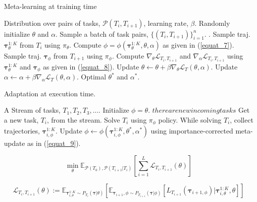 \documentclass[12pt,a4paper]{article}
\begin{document}
\begin{algorithm}
\caption{Meta-learning at training time}
\begin{algorithmic}[1]
	\Require Distribution over pairs of tasks, $\mathcal{P}(T_{i}, T_{i+1})$, learning rate, $\beta$.
	\State Randomly initialize $\theta$ and $\alpha$.
	\Repeat
		\State Sample a batch of task pairs, $\{(T_{i}, T_{i+1})\}_{i=1}^{n}$.
		.
			\State Sample traj. $\bm{\tau}_{\theta}^{1:K}$ from $T_{i}$ using $\pi_{\theta}$.
			\State Compute $\phi= \phi(\bm{\tau}_{\theta}^{1:K}, \theta, \alpha)$ as given in (\ref{equat_7}).
			\State Sample traj. $\bm{\tau}_{\phi}$ from $T_{i+1}$ using $\pi_{\phi}$.
		\EndFor
		\State Compute $\nabla_{\theta}\mathcal{L}_{T_i, T_{i+1}}$ and $\nabla_{\alpha}\mathcal{L}_{T_i, T_{i+1}}$ using $\bm{\tau}_{\theta}^{1:K}$ and $\bm{\tau}_{\phi}$ as given in (\ref{equat_8}).
		\State Update $\theta \leftarrow \theta + \beta\nabla_{\theta}\mathcal{L}_{T}(\theta, \alpha)$.
		\State Update $\alpha \leftarrow \alpha + \beta \nabla_{\alpha}\mathcal{L}_T(\theta, \alpha)$.
	\Ensure Optimal $\theta^{*}$ and $\alpha^{*}$.
\end{algorithmic}
\end{algorithm}

\begin{algorithm}
\caption{Adaptation at execution time.}
\begin{algorithmic} [1]
	\Require A Stream of tasks, $T_1, T_2, T_3, ...$.
	\State Initialize $\phi = \theta$.
	\While $there are new incoming tasks$
		\State Get a new task, $T_i$, from the stream.
		\State Solve $T_i$ using $\pi_{\phi}$ policy.
		\State While solving $T_i$, collect trajectories, $\bm{\tau}_{i, \phi}^{1:K}$.
		\State Update $\phi \leftarrow \phi(\bm{\tau}_{i, \phi}^{1:K}, \theta^{*}, \alpha^{*})$ using importance-corrected meta-update as in (\ref{equat_9}).
	\EndWhile
\end{algorithmic}
\end{algorithm}
\begin{equation}
\label{equat_5}
\min\limits_{\theta}\mathbb{E}_{\mathcal{P}(T_0), \mathcal{P}(T_{i+1}|T_i)}\left[ \sum\limits_{i=1}^{L}\mathcal{L}_{T_i, T_{i+1}}(\theta) \right]
\end{equation}

\begin{equation}
\label{equat_6}
\mathcal{L}_{T_i, T_{i+1}}(\theta) := \mathbb{E}_{\bm{\tau}_{i,\theta}^{1:K}\sim P_{T_i}(\bm{\tau}|\theta)}\left[ \mathbb{E}_{\bm{\tau}_{i+1}, \phi \sim P_{T_{i+1}}(\bm{\tau}|\phi)} [L_{T_{i+1}}(\bm{\tau}_{i+1, \phi})|\bm{\tau}_{i, \theta}^{1:K}, \theta] \right]
\end{equation}
\end{document}
